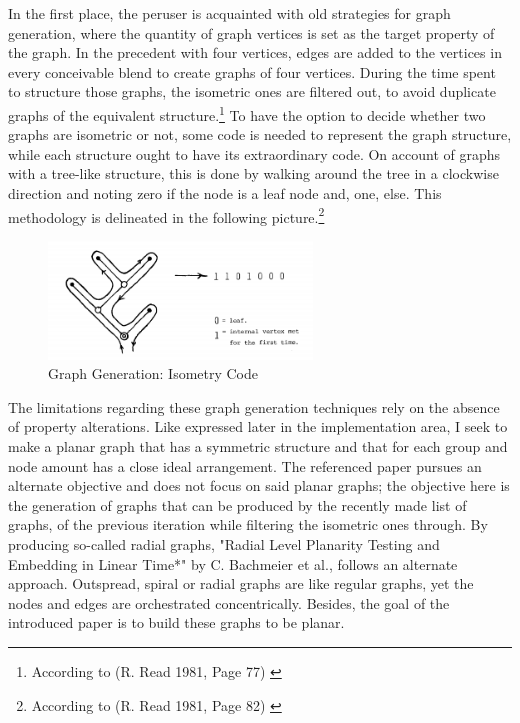 \documentclass[12pt,a4paper,oneside,american,parskip=half]{article}
\begin{document}
\begin{justify}
\begin{normalsize}
In the first place, the peruser is acquainted with old strategies for graph generation, where the quantity of graph vertices is set as the target property of the graph. 
In the precedent with four vertices, edges are added to the vertices in every conceivable blend to create graphs of four vertices.
During the time spent to structure those graphs, the isometric ones are filtered out, to avoid duplicate graphs of the equivalent structure.\footnote{According to (R. Read 1981, Page 77) \cite{graphGen}}
\newline
To have the option to decide whether two graphs are isometric or not, some code is needed to represent the graph structure, while each structure ought to have its extraordinary code. On account of graphs with a tree-like structure, this is done by walking around the tree in a clockwise direction and noting zero if the node is a leaf node and, one, else. This methodology is delineated in the following picture.\footnote{According to (R. Read 1981, Page 82) \cite{graphGen}}
\begin{figure}[h!]
\centering
\includegraphics[width=7cm]{graphGen.png}
\caption{Graph Generation: Isometry Code \cite{graphGen}}
\end{figure}
\newline
The limitations regarding these graph generation techniques rely on the absence of property alterations. Like expressed later in the implementation area, I seek to make a planar graph that has a symmetric structure and that for each group and node amount has a close ideal arrangement.
\newline
The referenced paper pursues an alternate objective and does not focus on said planar graphs; the objective here is the generation of graphs that can be produced by the recently made list of graphs, of the previous iteration while filtering the isometric ones through.
\newline
\newline
By producing so-called radial graphs, "Radial Level Planarity Testing and Embedding in Linear Time*" by C. Bachmeier et al., follows an alternate approach.
Outspread, spiral or radial graphs are like regular graphs, yet the nodes and edges are orchestrated concentrically. Besides, the goal of the introduced paper is to build these graphs to be planar.

\end{normalsize}
\end{justify}
\end{document}
